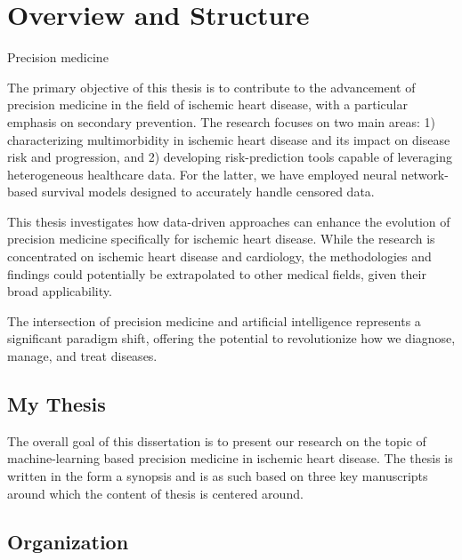\chapter{Overview and Structure} \label{intro}

Precision medicine


The primary objective of this thesis is to contribute to the advancement of
precision medicine in the field of ischemic heart disease, with a particular
emphasis on secondary prevention. The research focuses on two main areas: 1)
characterizing multimorbidity in ischemic heart disease and its impact on
disease risk and progression, and 2) developing risk-prediction tools capable
of leveraging heterogeneous healthcare data. For the latter, we have employed
neural network-based survival models designed to accurately handle censored
data.

This thesis investigates how data-driven approaches can enhance the evolution
of precision medicine specifically for ischemic heart disease. While the
research is concentrated on ischemic heart disease and cardiology, the
methodologies and findings could potentially be extrapolated to other medical
fields, given their broad applicability.

The intersection of precision medicine and artificial intelligence represents a
significant paradigm shift, offering the potential to revolutionize how we
diagnose, manage, and treat diseases.

\section{My Thesis}

The overall goal of this dissertation is to present 
our research on the topic of machine-learning based 
precision medicine in ischemic heart disease.
The thesis is written in the form a synopsis 
and is as such based on three key manuscripts around 
which the content of thesis is centered around.

\section{Organization}

